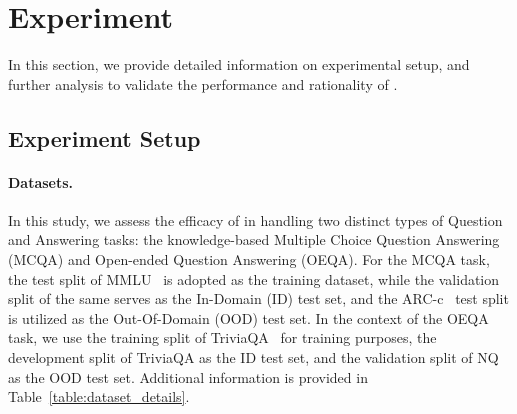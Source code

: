 \section{Experiment}
\label{sec:Experiment}
In this section, we provide detailed information on experimental setup, and further analysis to validate the performance and rationality of \M.


\subsection{Experiment Setup}
\paragraph{Datasets.}
In this study, we assess the efficacy of \M in handling two distinct types of Question and Answering tasks: the knowledge-based Multiple Choice Question Answering (MCQA) and Open-ended Question Answering (OEQA). For the MCQA task, the test split of MMLU~\cite{MMLU} is adopted as the training dataset, while the validation split of the same serves as the In-Domain (ID) test set, and the ARC-c~\cite{ARC_C} test split is utilized as the Out-Of-Domain (OOD) test set. In the context of the OEQA task, we use the training split of TriviaQA~\cite{triviaqa} for training purposes, the development split of TriviaQA as the ID test set, and the validation split of NQ~\cite{nq} as the OOD test set. Additional information is provided in Table~\ref{table:dataset_details}.

\begingroup
\fontsize{9}{11}\selectfont
\setlength{\tabcolsep}{1mm}
\begin{table}[h]
\centering
\caption{Datasets Details.}
\label{table:dataset_details}
\end{table}
\endgroup



